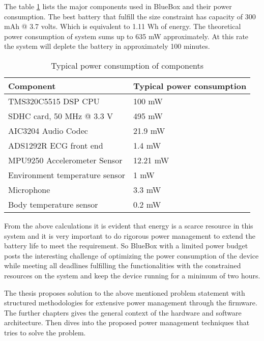 \hspace{10mm}The table \ref{table:power_rating} lists the major components used in BlueBox and their power consumption. The best battery that fulfill the size constraint has capacity of 300 mAh @ 3.7 volts. Which is equivalent to 1.11 Wh of energy. The theoretical power consumption of system sums up to 635 mW approximately. At this rate the system will deplete the battery in approximately 100 minutes. 
\begin{table}[h]
	\centering
	\begin{tabular}{|l|l|}
		\hline
		Component & Typical power consumption\\
		\hline
		TMS320C5515 DSP CPU &  100 mW \\
		SDHC card, 50 MHz @ 3.3 V   &  495 mW \\
		AIC3204 Audio Codec  &  21.9 mW \\	
		ADS1292R ECG front end & 1.4 mW \\
		MPU9250 Accelerometer Sensor &  12.21 mW \\
		Environment temperature sensor  &  1 mW \\
		Microphone  & 3.3 mW \\
		Body temperature sensor  &  0.2 mW \\	
		\hline
	\end{tabular}
	\caption{Typical power consumption of components}
	\label{table:power_rating}
\end{table}
\vspace*{-2mm}

\hspace{10mm}From the above calculations it is evident that energy is a scarce resource in this system and it is very important to do rigorous power management to extend the battery life to meet the requirement. So BlueBox with a limited power budget posts the interesting challenge of optimizing the power consumption of the device while meeting all deadlines fulfilling the functionalities with the constrained resources on the system and keep the device running for a minimum of two hours.

\hspace{10mm}The thesis proposes solution to the above mentioned problem statement with structured methodologies for extensive power management through the firmware. The further chapters gives the general context of the hardware and software architecture. Then dives into the proposed power management techniques that tries to solve the problem.

